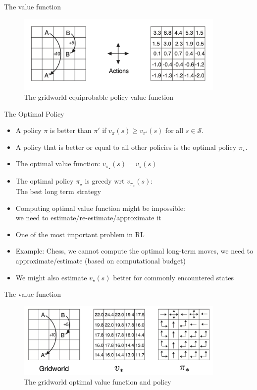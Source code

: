 \documentclass[10pt]{beamer}
\begin{document}
\begin{frame}{The value function}

\begin{figure}[h]
\centering
\includegraphics[width=0.9\textwidth]{fig/sutton_fig_3_5.png}
\caption{The gridworld equiprobable policy value function}
\end{figure}

\end{frame}

\begin{frame}{The Optimal Policy}

\begin{itemize}
\item A policy $\pi$ is {\color{uured}better} than $\pi'$ if $v_\pi(s) \geq v_{\pi'}(s)$ for all $s \in \mathcal{S}$.\pause
\item A policy that is better or equal to all other policies is the {\color{uured}optimal policy} $\pi_\star$.\pause
\item The optimal value function: $v_{\pi_\star}(s) = v_\star(s)$\pause
\item The optimal policy $\pi_\star$ is greedy wrt $v_{\pi_\star}(s)$: \\The best long term strategy\pause
\item Computing optimal value function might be {\color{uured}impossible}:\\ we need to estimate/re-estimate/approximate it\pause
\item One of the most important problem in RL\pause
\item {\color{uured}Example}: Chess, we cannot compute the optimal long-term moves, we need to approximate/estimate (based on computational budget)\pause
\item We might also estimate $v_\star(s)$ better for commonly encountered states
\end{itemize}

\end{frame}

\begin{frame}{The value function}

\begin{figure}[h]
\centering
\includegraphics[width=0.9\textwidth]{fig/sutton_fig_3_8.png}
\caption{The gridworld optimal value function and policy}
\end{figure}

\end{frame}
\end{document}
